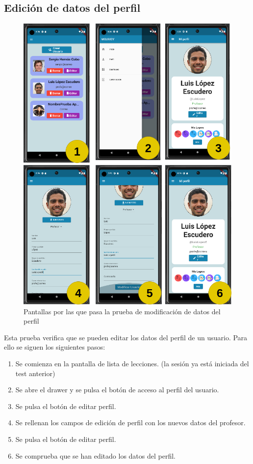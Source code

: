 \newpage


\subsection{Edición de datos del perfil}

\begin{figure}[H]
    \centering
    \includegraphics[width=\textwidth]{imagenes/c8/testint2.png}
    \caption{Pantallas por las que pasa la prueba de modificación de datos del perfil}
    \label{fig:prueba_creacion_usuario}
\end{figure}

Esta prueba verifica que se pueden editar los datos del perfil de un usuario. Para ello se siguen los siguientes pasos:

\begin{enumerate}
    \item Se comienza en la pantalla de lista de lecciones. (la sesión ya está iniciada del test anterior)
    \item Se abre el drawer y se pulsa el botón de acceso al perfil del usuario.
    \item Se pulsa el botón de editar perfil.
    \item Se rellenan los campos de edición de perfil con los nuevos datos del profesor.
    \item Se pulsa el botón de editar perfil.
    \item Se comprueba que se han editado los datos del perfil.
\end{enumerate}



